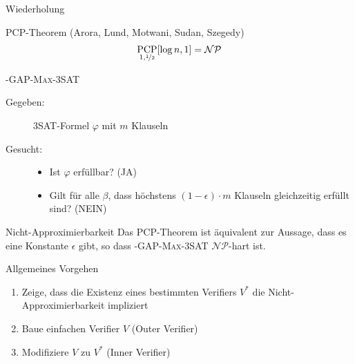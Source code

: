 \documentclass[table,german,10pt]{beamer}
\DeclareMathOperator{\pcp}{PCP}
\begin{document}
\begin{frame}{Wiederholung}
  \begin{block}{PCP-Theorem (Arora, Lund, Motwani, Sudan, Szegedy)}
    \vspace{-0.5cm}
    \begin{align*}
      \pcp_{1,\nicefrac{1}{2}}[\log n,1]=\mathcal{NP}
    \end{align*}
  \end{block}
  \pause
  \begin{block}{\textsc{\epsilon-GAP-Max-3SAT}}
    \begin{description}
    \item[Gegeben:] \textsc{3SAT}-Formel $\varphi$ mit $m$ Klauseln
    \item[Gesucht:] 
      \begin{itemize}
      \item Ist $\varphi$ erfüllbar? (JA)
      \item Gilt für alle $\beta$, dass höchstens $(1-\epsilon)\cdot m$
        Klauseln gleichzeitig erfüllt sind? (NEIN)
      \end{itemize}
    \end{description}
    
  \end{block}
\pause
  \begin{block}{Nicht-Approximierbarkeit}
    Das PCP-Theorem ist äquivalent zur Aussage, dass es eine Konstante
    $\epsilon$ gibt, so dass \textsc{\epsilon-GAP-Max-3SAT}
    $\mathcal{NP}$-hart ist.
    
  \end{block}
  
\end{frame}

\begin{frame}{Allgemeines Vorgehen}
  \begin{enumerate}[<+->]
  \item Zeige, dass die Existenz eines bestimmten Verifiers $V^{*}$ die
    Nicht-Approximierbarkeit impliziert
  \item Baue einfachen Verifier $V$ (Outer Verifier)
  \item Modifiziere $V$ zu $V^{*}$ (Inner Verifier)
  \end{enumerate}
  
\end{frame}
\end{document}
